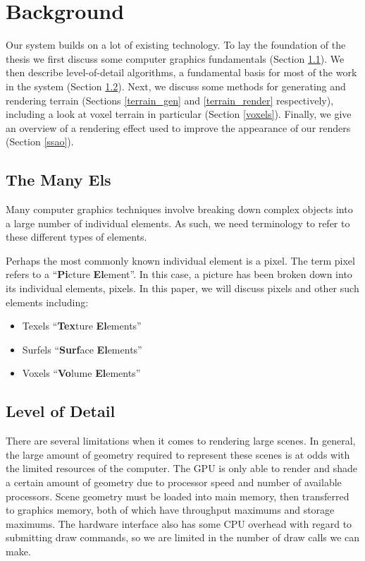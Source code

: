 
\chapter{Background} \label{bgrnd}

Our system builds on a lot of existing technology.
To lay the foundation of the thesis we first discuss some computer graphics fundamentals (Section \ref{els}).
We then describe level-of-detail algorithms, a fundamental basis for most of the work in the system (Section \ref{lod}).
Next, we discuss some methods for generating and rendering terrain (Sections \ref{terrain_gen} and \ref{terrain_render} respectively), including a look at voxel terrain in particular (Section \ref{voxels}).
Finally, we give an overview of a rendering effect used to improve the appearance of our renders (Section \ref{ssao}).


\section{The Many Els} \label{els}

Many computer graphics techniques involve breaking down complex objects into a large number of individual elements.
As such, we need terminology to refer to these different types of elements.

Perhaps the most commonly known individual element is a pixel.
The term pixel refers to a ``\textbf{Pi}cture \textbf{El}ement''.
In this case, a picture has been broken down into its individual elements, pixels.
In this paper, we will discuss pixels and other such elements including:

\begin{itemize}
	\item Texels ``\textbf{Tex}ture \textbf{El}ements''
	\item Surfels ``\textbf{Surf}ace \textbf{El}ements''
	\item Voxels ``\textbf{Vo}lume \textbf{El}ements''
\end{itemize}


\section{Level of Detail} \label{lod}

There are several limitations when it comes to rendering large scenes.
In general, the large amount of geometry required to represent these scenes is at odds with the limited resources of the computer.
The GPU is only able to render and shade a certain amount of geometry due to processor speed and number of available processors.
Scene geometry must be loaded into main memory, then transferred to graphics memory, both of which have throughput maximums and storage maximums.
The hardware interface also has some CPU overhead with regard to submitting draw commands, so we are limited in the number of draw calls we can make.


